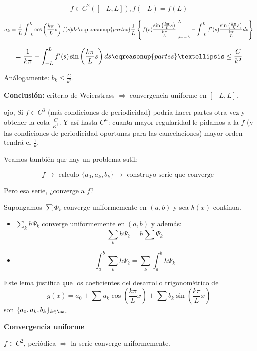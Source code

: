 		\[ f \in C^2 ([-L,L]), f(-L) = f(L) \]

		\[a_k = \frac{1}{L} \int^L_{-L} \cos \left( \frac{k \pi}{L} s \right) f(s) ds \eqreasonup{partes} \frac{1}{L} \left\{ \left. f(s) \frac{\sin \left( \frac{k \pi}{L} s \right)}{\frac{k \pi}{L}} \right|_{s=-L}^{L} -  \int^L_{-L} f'(s) \frac{\sin \left( \frac{k \pi}{L} s \right)}{\frac{k \pi}{L}} ds   \right\}  \]

		\[ = \frac{1}{k\pi} -  \int^L_{-L} f'(s) \sin \left( \frac{k \pi}{L} s \right) ds \eqreasonup{partes} … \leq \frac{C}{k^2} \]

		Análogamente: $b_k \leq \frac{C}{k^2}$.

		\textbf{Conclusión:} criterio de Weierstrass $\Rightarrow$ convergencia uniforme en $[-L,L]$.

		\obs ojo, Si $f \in C^3$ (más condiciones de periodicidad) podría hacer partes otra vez y obtener la cota $\frac{C}{K^3}$. Y así hasta $C^n$: cuanta mayor regularidad le pidamos a la $f$ (y las condiciones de periodicidad oportunas para las cancelaciones) mayor orden tendrá el $\frac{1}{k}$.

		Veamos también que hay un problema sutil:

		\[f \rightarrow \text{ calculo } \{a_0,a_k,b_k\} \rightarrow \text{ construyo serie que converge } \]

		Pero esa serie, ¿converge a $f$?

		\begin{lemma}
			Supongamos $\sum \Phi_k$ converge uniformemente en $(a,b)$ y sea $h(x)$ contínua.

			\begin{itemize}
				\item $\sum_k h \Psi_k$ converge uniformemente en $(a,b)$ y además:
				\[ \sum_k h \Psi_k = h \sum \Psi_k\]

				\item \[\int_a^b \sum_k h \Psi_k = \sum_k \int_a^b h \Psi_k \]
			\end{itemize}

		\end{lemma}

		Este lema justifica que los coeficientes del desarrollo trigonométrico de$$g(x) = a_0 + \sum a_k \cos \left( \frac{k \pi}{L} x \right) + \sum b_k \sin \left( \frac{k \pi}{L} x \right) $$ son $\{a_0,a_k,b_k\}_{k \in \nat}$

		\textbf{Convergencia uniforme}

		$f \in C^2$, periódica $\Rightarrow$ la serie converge uniformemente.

